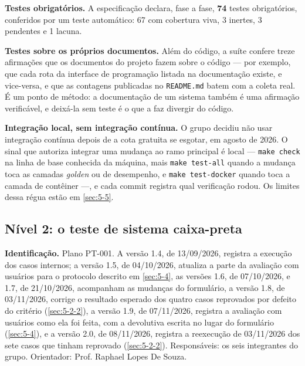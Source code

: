
\textbf{Testes obrigatórios.} A especificação declara, fase a fase, \textbf{74} testes obrigatórios, conferidos por um teste automático: 67 com cobertura viva, 3 inertes, 3 pendentes e 1 lacuna.


\textbf{Testes sobre os próprios documentos.} Além do código, a suíte confere treze afirmações que os documentos do projeto fazem sobre o código --- por exemplo, que cada rota da interface de programação listada na documentação existe, e vice-versa, e que as contagens publicadas no \texttt{README.\allowbreak{}md} batem com a coleta real. É um ponto de método: a documentação de um sistema também é uma afirmação verificável, e deixá-la sem teste é o que a faz divergir do código.


\textbf{Integração local, sem integração contínua.} O grupo decidiu não usar integração contínua depois de a cota gratuita se esgotar, em agosto de 2026. O sinal que autoriza integrar uma mudança ao ramo principal é local --- \texttt{make check} na linha de base conhecida da máquina, mais \texttt{make test-\allowbreak{}all} quando a mudança toca as camadas \textit{golden} ou de desempenho, e \texttt{make test-\allowbreak{}docker} quando toca a camada de contêiner ---, e cada commit registra qual verificação rodou. Os limites dessa régua estão em \ref{sec:5-5}.


\subsection{Nível 2: o teste de sistema caixa-preta}\label{sec:5-1-3}

\textbf{Identificação.} Plano PT-001. A versão 1.4, de 13/09/2026, registra a execução dos casos internos; a versão 1.5, de 04/10/2026, atualiza a parte da avaliação com usuários para o protocolo descrito em \ref{sec:5-4}, as versões 1.6, de 07/10/2026, e 1.7, de 21/10/2026, acompanham as mudanças do formulário, a versão 1.8, de 03/11/2026, corrige o resultado esperado dos quatro casos reprovados por defeito do critério (\ref{sec:5-2-2}), a versão 1.9, de 07/11/2026, registra a avaliação com usuários como ela foi feita, com a devolutiva escrita no lugar do formulário (\ref{sec:5-4}), e a versão 2.0, de 08/11/2026, registra a reexecução de 03/11/2026 dos sete casos que tinham reprovado (\ref{sec:5-2-2}). Responsáveis: os seis integrantes do grupo. Orientador: Prof. Raphael Lopes De Souza.

